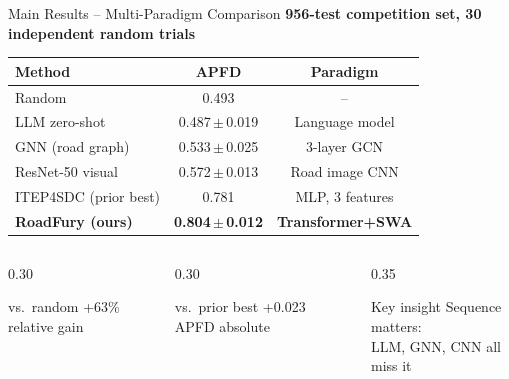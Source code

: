 \documentclass[aspectratio=169,10pt]{beamer}
\begin{document}
\begin{frame}{Main Results -- Multi-Paradigm Comparison}
  \textbf{956-test competition set, 30 independent random trials}
  \vspace{6pt}

  \begin{center}
  \begin{tabular}{lcc}
    \toprule
    \textbf{Method} & \textbf{APFD} & \textbf{Paradigm} \\
    \midrule
    Random                   & 0.493              & -- \\
    LLM zero-shot            & 0.487\,$\pm$\,0.019 & Language model \\
    GNN (road graph)         & 0.533\,$\pm$\,0.025 & 3-layer GCN \\
    ResNet-50 visual         & 0.572\,$\pm$\,0.013 & Road image CNN \\
    ITEP4SDC (prior best)    & 0.781              & MLP, 3 features \\
    \rowcolor{mLightBrown!20}
    \textbf{RoadFury (ours)} & \textbf{0.804\,$\pm$\,0.012} & \textbf{Transformer+SWA} \\
    \bottomrule
  \end{tabular}
  \end{center}

  \vspace{6pt}
  \begin{columns}[T]
    \begin{column}{0.30\linewidth}
      \begin{block}{\small vs.\ random}
        \centering +63\% relative gain
      \end{block}
    \end{column}
    \begin{column}{0.30\linewidth}
      \begin{block}{\small vs.\ prior best}
        \centering +0.023 APFD absolute
      \end{block}
    \end{column}
    \begin{column}{0.35\linewidth}
      \begin{alertblock}{\small Key insight}
        Sequence matters:\\
        LLM, GNN, CNN all miss it
      \end{alertblock}
    \end{column}
  \end{columns}
\end{frame}
\end{document}
